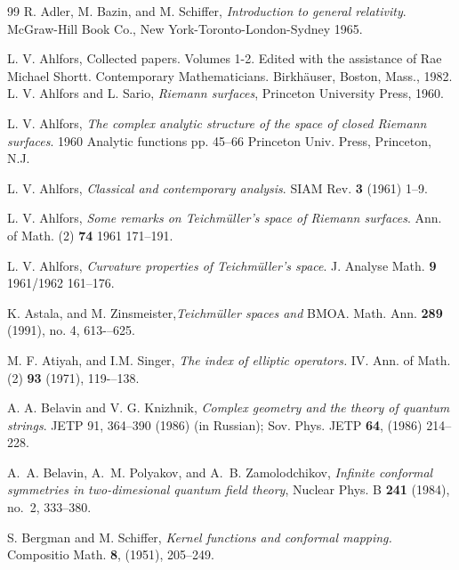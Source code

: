 \documentclass[12pt]{amsart}
\theoremstyle{plain}
\theoremstyle{definition}
\theoremstyle{remark}
\numberwithin{equation}{section} %
\numberwithin{figure}{section} %
\begin{document}
\begin{thebibliography}{99}
 R. Adler, M.  Bazin, and M. Schiffer, {\it Introduction to general relativity}. McGraw-Hill Book Co., New York-Toronto-London-Sydney 1965.

 L. V. Ahlfors,  Collected papers. Volumes 1-2. Edited with the assistance of Rae Michael Shortt. Contemporary Mathematicians. Birkh\"auser, Boston, Mass., 1982.
L. V. Ahlfors and L. Sario, \emph{Riemann surfaces}, Princeton University
  Press, 1960.

 L. V. Ahlfors, {\textit{The complex analytic structure of the space of closed Riemann surfaces}}. 1960 Analytic functions pp. 45--66 Princeton Univ. Press, Princeton, N.J.

  L. V. Ahlfors, {\it{Classical and contemporary analysis}}. SIAM Rev. {\bf 3} (1961) 1--9.

 L. V. Ahlfors, {\it{Some remarks on Teichmüller's space of Riemann surfaces}}.
 Ann. of Math. (2) {\bf 74} 1961 171--191.

 L. V. Ahlfors,  {\it{Curvature properties of Teichm\"uller's space}}.
 J. Analyse Math. {\bf 9} 1961/1962 161--176.


    
 K. Astala, and M. Zinsmeister,{\it Teichm\"uller spaces and} BMOA. Math. Ann. {\bf 289} (1991), no. 4, 613-–625.


  M. F. Atiyah, and I.M. Singer, {\it The index of elliptic operators.} IV. Ann. of Math. (2) {\bf 93} (1971), 119-–138.

 A. A. Belavin and V. G. Knizhnik, {\it{Complex geometry and the theory of quantum strings}}. JETP 91,
364--390 (1986) (in Russian); Sov. Phys. JETP \textbf{64}, (1986) 214--228.

A.~A. Belavin, A.~M. Polyakov, and A.~B. Zamolodchikov, \emph{Infinite conformal
  symmetries in two-dimesional quantum field theory}, Nuclear Phys. B
  \textbf{241} (1984), no.~2, 333--380.

  S. Bergman and M. Schiffer,
  {\it Kernel functions and conformal mapping.} Compositio Math. {\bf 8}, (1951), 205--249.
  

\end{thebibliography}
\end{document}

